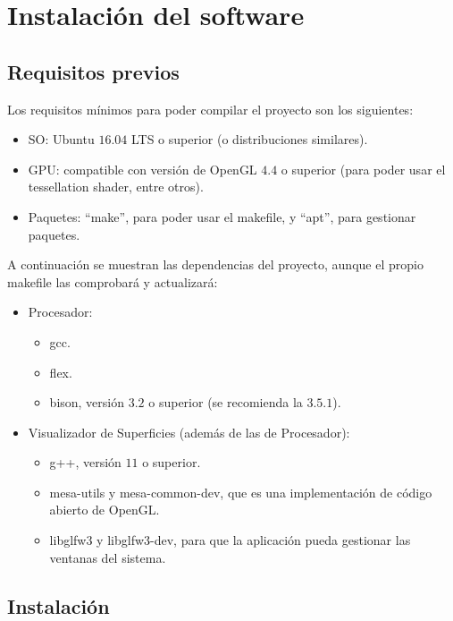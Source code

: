 
\chapter{Instalación del software}\label{ap:apendice1}

\section{Requisitos previos}

Los requisitos mínimos para poder compilar el proyecto son los siguientes:
\begin{itemize}
	\item SO: Ubuntu $16.04$ LTS o superior (o distribuciones similares).
	\item GPU: compatible con versión de OpenGL $4.4$ o superior (para poder usar el tessellation shader, entre otros).
	\item Paquetes: ``make'', para poder usar el makefile, y ``apt'', para gestionar paquetes.
\end{itemize}

A continuación se muestran las dependencias del proyecto, aunque el propio makefile las comprobará y actualizará:
\begin{itemize}
	\item Procesador:
	\begin{itemize}
		\item gcc.
		\item flex.
		\item bison, versión $3.2$ o superior (se recomienda la $3.5.1$).
	\end{itemize}
	\item Visualizador de Superficies (además de las de Procesador):
	\begin{itemize}
		\item g++, versión $11$ o superior.
		\item mesa-utils y mesa-common-dev, que es una implementación de código abierto de OpenGL.
		\item libglfw$3$ y libglfw$3$-dev, para que la aplicación pueda gestionar las ventanas del sistema.
	\end{itemize}
\end{itemize}

\section{Instalación}

